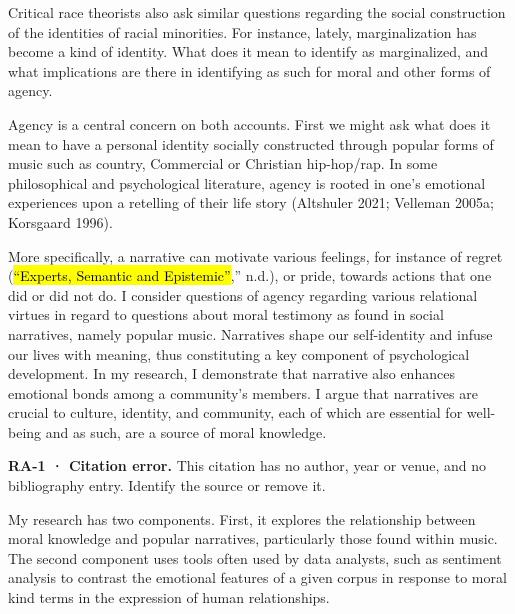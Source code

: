 \documentclass[
  letterpaper,
  DIV=11,
  numbers=noendperiod]{scrartcl}
\theoremstyle{remark}
\begin{document}
Critical race theorists also ask similar questions regarding the social
construction of the identities of racial minorities. For instance,
lately, marginalization has become a kind of identity. What does it mean
to identify as marginalized, and what implications are there in
identifying as such for moral and other forms of agency.

Agency is a central concern on both accounts. First we might ask what
does it mean to have a personal identity socially constructed through
popular forms of music such as country, Commercial or Christian
hip-hop/rap. In some philosophical and psychological literature, agency
is rooted in one's emotional experiences upon a retelling of their life
story (Altshuler 2021; Velleman 2005a; Korsgaard 1996).

More specifically, a narrative can motivate various feelings, for
instance of regret (\hl{``Experts, Semantic and Epistemic''},'' n.d.),
or pride, towards actions that one did or did not do. I consider
questions of agency regarding various relational virtues in regard to
questions about moral testimony as found in social narratives, namely
popular music. Narratives shape our self-identity and infuse our lives
with meaning, thus constituting a key component of psychological
development. In my research, I demonstrate that narrative also enhances
emotional bonds among a community's members. I argue that narratives are
crucial to culture, identity, and community, each of which are essential
for well-being and as such, are a source of moral knowledge.

\begin{tcolorbox}[enhanced jigsaw, arc=.35mm, bottomrule=.15mm, bottomtitle=1mm, breakable, colback=white, colbacktitle=quarto-callout-warning-color!10!white, colframe=quarto-callout-warning-color-frame, coltitle=black, left=2mm, leftrule=.75mm, opacityback=0, opacitybacktitle=0.6, rightrule=.15mm, title=\textcolor{quarto-callout-warning-color}{\faExclamationTriangle}\hspace{0.5em}{Warning}, titlerule=0mm, toprule=.15mm, toptitle=1mm]

\textbf{RA-1 · Citation error.} This citation has no author, year or
venue, and no bibliography entry. Identify the source or remove it.

\end{tcolorbox}

My research has two components. First, it explores the relationship
between moral knowledge and popular narratives, particularly those found
within music. The second component uses tools often used by data
analysts, such as sentiment analysis to contrast the emotional features
of a given corpus in response to moral kind terms in the expression of
human relationships.
\end{document}
